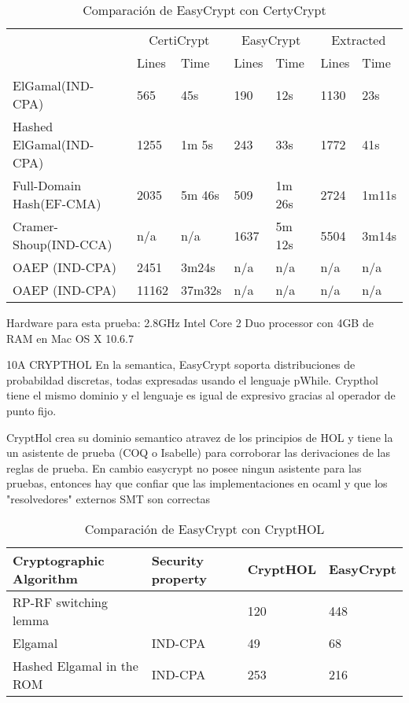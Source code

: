 \documentclass[runningheads,a4paper]{llncs}
\begin{document}
\begin{table}
  \caption{Comparación de EasyCrypt con CertyCrypt}
  \label{tab:simple1}
  \centering
  \begin{tabular}{ |p{3.5cm}|p{1.5cm}|p{1.5cm}|p{1.5cm}|p{1.5cm}|p{1.5cm}|p{1.5cm}|  }
 \hline
 & \multicolumn{2}{|c|}{CertiCrypt} & \multicolumn{2}{|c|}{EasyCrypt} & \multicolumn{2}{|c|}{Extracted} \\\cline{2-7}

 &Lines&Time&Lines&Time&Lines&Time\\\cline{2-7}
 \hline
 ElGamal(IND-CPA) & 565 & 45s & 190 & 12s & 1130 & 23s\\
 Hashed ElGamal(IND-CPA) & 1255  & 1m 5s & 243  & 33s & 1772 & 41s\\
 Full-Domain Hash(EF-CMA) & 2035 & 5m 46s&  509 & 1m 26s & 2724 & 1m11s\\
 Cramer-Shoup(IND-CCA) & n/a & n/a & 1637 & 5m 12s & 5504 & 3m14s\\
 OAEP (IND-CPA) & 2451 & 3m24s & n/a & n/a & n/a & n/a\\
 OAEP (IND-CPA) & 11162 & 37m32s & n/a & n/a & n/a & n/a\\
 \hline
\end{tabular}
\end{table}

Hardware para esta prueba: 2.8GHz Intel Core 2 Duo processor con 4GB de RAM en Mac OS X 10.6.7

10A
\cite{article8}
CRYPTHOL
En la semantica, EasyCrypt soporta distribuciones de probabildad discretas, todas expresadas usando el lenguaje pWhile. Crypthol tiene el mismo dominio y el lenguaje es igual de expresivo gracias al operador de punto fijo.

CryptHol crea su dominio semantico atravez de los principios de HOL y tiene la un asistente de prueba (COQ o Isabelle) para corroborar las derivaciones de las reglas de prueba. En cambio easycrypt no posee ningun asistente para las pruebas, entonces hay que confiar que las implementaciones en ocaml y que los "resolvedores" externos SMT son correctas


\begin{table}
  \caption{Comparación de EasyCrypt con CryptHOL}
  \label{tab:simple1}
  \centering
  \begin{tabular}{ |p{4cm}|p{1.5cm}|p{1.5cm}|p{1.5cm}|  }
 \hline
 Cryptographic Algorithm & Security property & CryptHOL & EasyCrypt\\\cline{1-4}
 \hline
 RP-RF switching lemma &  & 120 & 448\\
 Elgamal & IND-CPA & 49  & 68\\
 Hashed Elgamal in the ROM & IND-CPA & 253 &  216\\
 \hline
\end{tabular}
\end{table}
\end{document}

